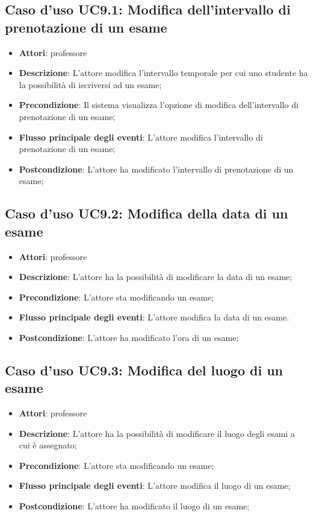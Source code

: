 \subsection{Caso d'uso \texorpdfstring{UC9.1}{UC9.1}: Modifica dell'intervallo di prenotazione di un esame}
\begin{itemize}
\item \textbf{Attori}: professore
\item \textbf{Descrizione}: L'attore modifica l'intervallo temporale per cui uno studente ha la possibilità di iscriversi ad un esame;
\item \textbf{Precondizione}: Il sistema visualizza l'opzione di modifica dell'intervallo di prenotazione di un esame;
\item \textbf{Flusso principale degli eventi}: L'attore modifica l'intervallo di prenotazione di un esame;
\item \textbf{Postcondizione}: L'attore ha modificato l'intervallo di prenotazione di un esame;
\end{itemize}
\subsection{Caso d'uso \texorpdfstring{UC9.2}{UC9.2}: Modifica della data di un esame}
\begin{itemize}
\item \textbf{Attori}: professore
\item \textbf{Descrizione}: L'attore ha la possibilità di modificare la data di un esame;
\item \textbf{Precondizione}: L'attore sta modificando un esame;
\item \textbf{Flusso principale degli eventi}: L'attore modifica la data di un esame.
\item \textbf{Postcondizione}: L'attore ha modificato l'ora di un esame;
\end{itemize}
\subsection{Caso d'uso \texorpdfstring{UC9.3}{UC9.3}: Modifica del luogo di un esame}
\begin{itemize}
\item \textbf{Attori}: professore
\item \textbf{Descrizione}: L'attore ha la possibilità di modificare il luogo degli esami a cui è assegnato;
\item \textbf{Precondizione}: L'attore sta modificando un esame;
\item \textbf{Flusso principale degli eventi}: L'attore modifica il luogo di un esame;
\item \textbf{Postcondizione}: L'attore ha modificato il luogo di un esame;
\end{itemize}
